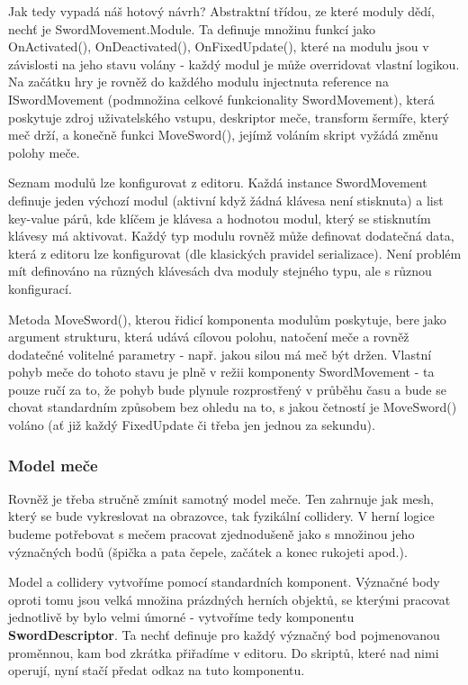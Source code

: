 Jak tedy vypadá náš hotový návrh? Abstraktní třídou, ze které moduly dědí, nechť je SwordMovement.Module. Ta definuje množinu funkcí jako OnActivated(), OnDeactivated(), OnFixedUpdate(), které na modulu jsou v závislosti na jeho stavu volány - každý modul je může overridovat vlastní logikou. Na začátku hry je rovněž do každého modulu injectnuta reference na ISwordMovement (podmnožina celkové funkcionality SwordMovement), která poskytuje zdroj uživatelského vstupu, deskriptor meče, transform šermíře, který meč drží, a konečně funkci MoveSword(), jejímž voláním skript vyžádá změnu polohy meče.

Seznam modulů lze konfigurovat z editoru. Každá instance SwordMovement definuje jeden výchozí modul (aktivní když žádná klávesa není stisknuta) a list key-value párů, kde klíčem je klávesa a hodnotou modul, který se stisknutím klávesy má aktivovat. Každý typ modulu rovněž může definovat dodatečná data, která z editoru lze konfigurovat (dle klasických pravidel serializace). Není problém mít definováno na různých klávesách dva moduly stejného typu, ale s různou konfigurací.

Metoda MoveSword(), kterou řidicí komponenta modulům poskytuje, bere jako argument strukturu, která udává cílovou polohu, natočení meče a rovněž dodatečné volitelné parametry - např. jakou silou má meč být držen. Vlastní pohyb meče do tohoto stavu je plně v režii komponenty SwordMovement - ta pouze ručí za to, že pohyb bude plynule rozprostřený v průběhu času a bude se chovat standardním způsobem bez ohledu na to, s jakou četností je MoveSword() voláno (ať již každý FixedUpdate či třeba jen jednou za sekundu).

\subsubsection*{Model meče} \label{interfacesSwordModelSubsubsection}

Rovněž je třeba stručně zmínit samotný model meče. Ten zahrnuje jak mesh, který se bude vykreslovat na obrazovce, tak fyzikální collidery. V herní logice budeme potřebovat s mečem pracovat zjednodušeně jako s množinou jeho význačných bodů (špička a pata čepele, začátek a konec rukojeti apod.).

Model a collidery vytvoříme pomocí standardních komponent. Význačné body oproti tomu jsou velká množina prázdných herních objektů, se kterými pracovat jednotlivě by bylo velmi úmorné - vytvoříme tedy komponentu \textbf{SwordDescriptor}. Ta nechť definuje pro každý význačný bod pojmenovanou proměnnou, kam bod zkrátka přiřadíme v editoru. Do skriptů, které nad nimi operují, nyní stačí předat odkaz na tuto komponentu.


